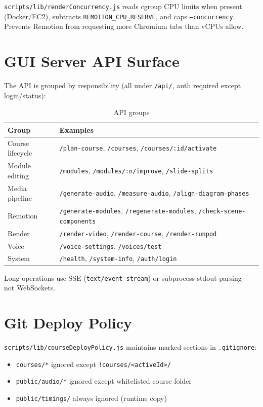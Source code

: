 \documentclass{scinexus}
\newcommand{\tableheadrow}[1]{\sffamily\bfseries\color{rbnavy} #1}
\begin{document}
\texttt{scripts/lib/renderConcurrency.js} reads cgroup CPU limits when present (Docker/EC2), subtracts \texttt{REMOTION\_CPU\_RESERVE}, and caps \texttt{--concurrency}. Prevents Remotion from requesting more Chromium tabs than vCPUs allow.

\section{GUI Server API Surface}

The API is grouped by responsibility (all under \texttt{/api/}, auth required except login/status):

\begin{table}[htbp]
	\centering
	\footnotesize
	\caption{API groups}
	\begin{tabularx}{\textwidth}{@{}l L@{}}
		\toprule
		\tableheadrow{Group} & \tableheadrow{Examples} \\
		\midrule
		Course lifecycle & \texttt{/plan-course}, \texttt{/courses}, \texttt{/courses/:id/activate} \\
		Module editing & \texttt{/modules}, \texttt{/modules/:n/improve}, \texttt{/slide-splits} \\
		Media pipeline & \texttt{/generate-audio}, \texttt{/measure-audio}, \texttt{/align-diagram-phases} \\
		Remotion & \texttt{/generate-modules}, \texttt{/regenerate-modules}, \texttt{/check-scene-components} \\
		Render & \texttt{/render-video}, \texttt{/render-course}, \texttt{/render-runpod} \\
		Voice & \texttt{/voice-settings}, \texttt{/voices/test} \\
		System & \texttt{/health}, \texttt{/system-info}, \texttt{/auth/login} \\
		\bottomrule
	\end{tabularx}
\end{table}

Long operations use SSE (\texttt{text/event-stream}) or subprocess stdout parsing --- not WebSockets.

\section{Git Deploy Policy}

\texttt{scripts/lib/courseDeployPolicy.js} maintains marked sections in \texttt{.gitignore}:

\begin{itemize}
	\item \texttt{courses/*} ignored except \texttt{!courses/<activeId>/}
	\item \texttt{public/audio/*} ignored except whitelisted course folder
	\item \texttt{public/timings/} always ignored (runtime copy)
\end{itemize}
\end{document}
